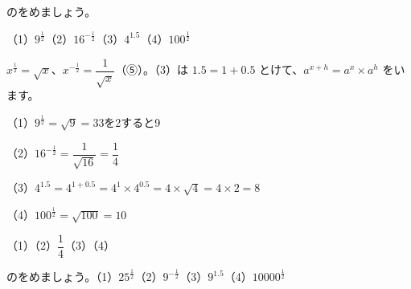 \begin{reidai}[\R{分数}{ぶん|すう}の\R{指数}{し|すう}]
のをめましょう。\par
（1）\nobreak $9^{\frac{1}{2}}$\qquad（2）\nobreak $16^{-\frac{1}{2}}$\qquad（3）\nobreak $4^{1.5}$\qquad（4）\nobreak $100^{\frac{1}{2}}$\par
\kangaekata $x^{\frac{1}{2}}=\sqrt{x}$、$x^{-\frac{1}{2}}=\dfrac{1}{\sqrt{x}}$（⑤）。（3）は $1.5=1+0.5$ とけて、$a^{x+h}=a^x\times a^h$ をいます。\par
\shiki（1）\nobreak $9^{\frac{1}{2}}=\sqrt{9}=3$\quad 3を2すると9\par
\hspace*{2.6\zw}（2）\nobreak $16^{-\frac{1}{2}}=\dfrac{1}{\sqrt{16}}=\dfrac{1}{4}$\par
\hspace*{2.6\zw}（3）\nobreak $4^{1.5}=4^{1+0.5}=4^1\times4^{0.5}=4\times\sqrt{4}=4\times2=8$\par
\hspace*{2.6\zw}（4）\nobreak $100^{\frac{1}{2}}=\sqrt{100}=10$\par
\kotae（1）\quad（2）\nobreak $\dfrac{1}{4}$\quad（3）\quad（4）
\end{reidai}

\begin{jibun}
のをめましょう。（1）\nobreak $25^{\frac{1}{2}}$\quad（2）\nobreak $9^{-\frac{1}{2}}$\quad（3）\nobreak $9^{1.5}$\quad（4）\nobreak $10000^{\frac{1}{2}}$
\end{jibun}

